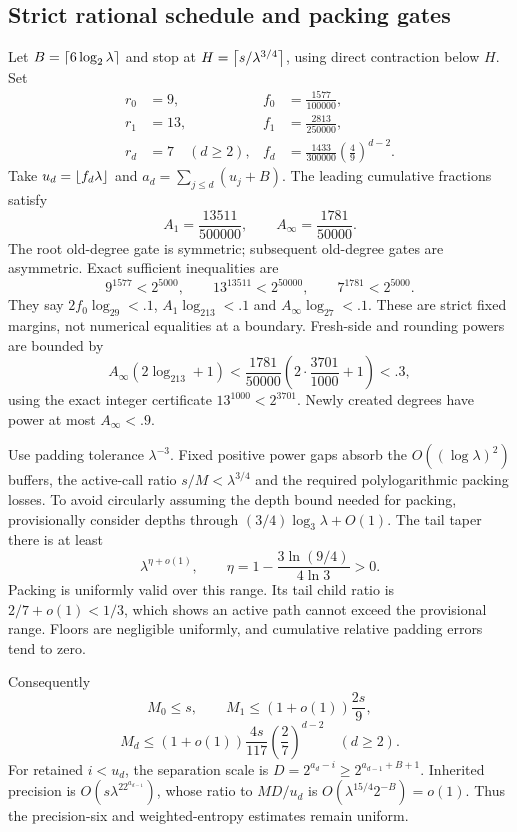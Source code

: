 \documentclass[11pt,letterpaper]{article}
\theoremstyle{remark}\newtheorem{remark}[theorem]{Remark}
\begin{document}
\subsection{Strict rational schedule and packing gates}
Let $B=\left\lceil6\log_2\lambda\right\rceil$ and stop at $H=\left\lceil s/\lambda^{3/4}\right\rceil$, using direct contraction below $H$. Set
\begin{align*}
 r_0&=9, & f_0&=\frac{1577}{100000},\\
 r_1&=13, & f_1&=\frac{2813}{250000},\\
 r_d&=7\quad(d\ge2), & f_d&=\frac{1433}{300000}
                                  \left(\frac49\right)^{d-2}.
\end{align*}
Take $u_d=\left\lfloor f_d\lambda\right\rfloor$ and $a_d=\sum_{j\le d}(u_j+B)$. The leading cumulative fractions satisfy
\[
 A_1=\frac{13511}{500000},\qquad
 A_\infty=\frac{1781}{50000}.
\]
The root old-degree gate is symmetric; subsequent old-degree gates are asymmetric. Exact sufficient inequalities are
\begin{equation}\label{eq:gates3}
 9^{1577}<2^{5000},\qquad
 13^{13511}<2^{50000},\qquad
 7^{1781}<2^{5000}.
\end{equation}
They say $2f_0\log_29<.1$, $A_1\log_213<.1$ and $A_\infty\log_27<.1$. These are strict fixed margins, not numerical equalities at a boundary. Fresh-side and rounding powers are bounded by
\[
 A_\infty(2\log_213+1)
 <\frac{1781}{50000}\left(2\cdot\frac{3701}{1000}+1\right)<.3,
\]
using the exact integer certificate $13^{1000}<2^{3701}$. Newly created degrees have power at most $A_\infty<.9$.

Use padding tolerance $\lambda^{-3}$. Fixed positive power gaps absorb the $O((\log\lambda)^2)$ buffers, the active-call ratio $s/M<\lambda^{3/4}$ and the required polylogarithmic packing losses. To avoid circularly assuming the depth bound needed for packing, provisionally consider depths through $(3/4)\log_3\lambda+O(1)$. The tail taper there is at least
\[
 \lambda^{\eta+o(1)},\qquad
 \eta=1-\frac{3\ln(9/4)}{4\ln3}>0.
\]
Packing is uniformly valid over this range. Its tail child ratio is $2/7+o(1)<1/3$, which shows an active path cannot exceed the provisional range. Floors are negligible uniformly, and cumulative relative padding errors tend to zero.

Consequently
\[
 M_0\le s,\qquad M_1\le(1+o(1))\frac{2s}9,
\]
\[
 M_d\le(1+o(1))\frac{4s}{117}
                      \left(\frac27\right)^{d-2}\quad(d\ge2).
\]
For retained $i<u_d$, the separation scale is
$D=2^{a_d-i}\ge2^{a_{d-1}+B+1}$. Inherited precision is
$O(s\lambda^22^{a_{d-1}})$, whose ratio to $MD/u_d$ is
$O(\lambda^{15/4}2^{-B})=o(1)$. Thus the precision-six and weighted-entropy estimates remain uniform.
\end{document}
